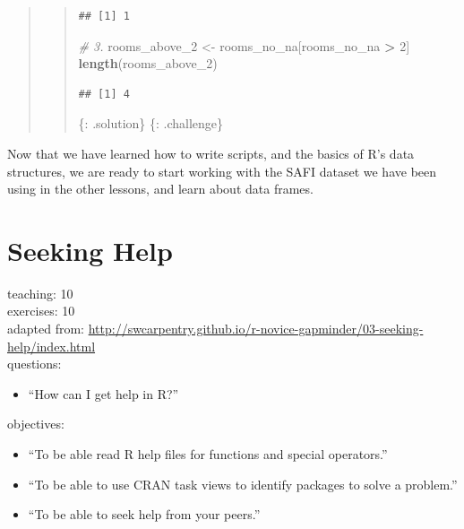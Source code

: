\documentclass[]{book}
\newenvironment{Shaded}{\begin{snugshade}}{\end{snugshade}}
\newcommand{\KeywordTok}[1]{\textcolor[rgb]{0.13,0.29,0.53}{\textbf{#1}}}
\newcommand{\DecValTok}[1]{\textcolor[rgb]{0.00,0.00,0.81}{#1}}
\newcommand{\StringTok}[1]{\textcolor[rgb]{0.31,0.60,0.02}{#1}}
\newcommand{\CommentTok}[1]{\textcolor[rgb]{0.56,0.35,0.01}{\textit{#1}}}
\newcommand{\OperatorTok}[1]{\textcolor[rgb]{0.81,0.36,0.00}{\textbf{#1}}}
\newcommand{\NormalTok}[1]{#1}
\providecommand{\tightlist}{%
  \setlength{\itemsep}{0pt}\setlength{\parskip}{0pt}}
\begin{document}
\begin{quote}
\begin{quote}
\begin{verbatim}
## [1] 1
\end{verbatim}

\begin{Shaded}
\begin{Highlighting}[]
\CommentTok{# 3.}
\NormalTok{rooms_above_}\DecValTok{2}\NormalTok{ <-}\StringTok{ }\NormalTok{rooms_no_na[rooms_no_na }\OperatorTok{>}\StringTok{ }\DecValTok{2}\NormalTok{]}
\KeywordTok{length}\NormalTok{(rooms_above_}\DecValTok{2}\NormalTok{)}
\end{Highlighting}
\end{Shaded}

\begin{verbatim}
## [1] 4
\end{verbatim}

\{: .solution\} \{: .challenge\}
\end{quote}
\end{quote}

Now that we have learned how to write scripts, and the basics of R's
data structures, we are ready to start working with the SAFI dataset we
have been using in the other lessons, and learn about data frames.

\chapter{Seeking Help}\label{help}

teaching: 10\\
exercises: 10\\
adapted from:
\url{http://swcarpentry.github.io/r-novice-gapminder/03-seeking-help/index.html}\\
questions:

\begin{itemize}
\tightlist
\item
  ``How can I get help in R?''
\end{itemize}

objectives:

\begin{itemize}
\tightlist
\item
  ``To be able read R help files for functions and special
  operators.''\\
\item
  ``To be able to use CRAN task views to identify packages to solve a
  problem.''\\
\item
  ``To be able to seek help from your peers.''
\end{itemize}
\end{document}
